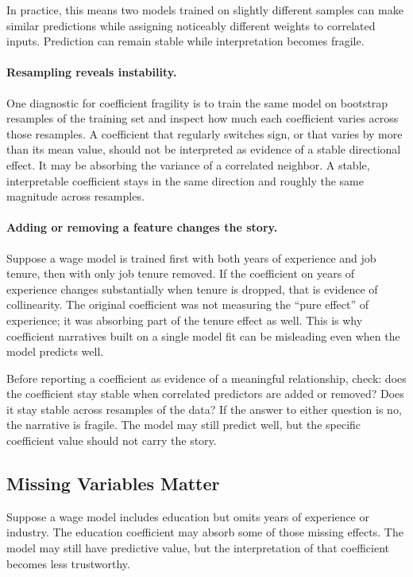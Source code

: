 In practice, this means two models trained on slightly different samples can make similar predictions while assigning noticeably different weights to correlated inputs. Prediction can remain stable while interpretation becomes fragile.

\paragraph{Resampling reveals instability.} One diagnostic for coefficient fragility is to train the same model on bootstrap resamples of the training set and inspect how much each coefficient varies across those resamples. A coefficient that regularly switches sign, or that varies by more than its mean value, should not be interpreted as evidence of a stable directional effect. It may be absorbing the variance of a correlated neighbor. A stable, interpretable coefficient stays in the same direction and roughly the same magnitude across resamples.

\paragraph{Adding or removing a feature changes the story.} Suppose a wage model is trained first with both years of experience and job tenure, then with only job tenure removed. If the coefficient on years of experience changes substantially when tenure is dropped, that is evidence of collinearity. The original coefficient was not measuring the ``pure effect'' of experience; it was absorbing part of the tenure effect as well. This is why coefficient narratives built on a single model fit can be misleading even when the model predicts well.

\begin{warningbox}
Before reporting a coefficient as evidence of a meaningful relationship, check: does the coefficient stay stable when correlated predictors are added or removed? Does it stay stable across resamples of the data? If the answer to either question is no, the narrative is fragile. The model may still predict well, but the specific coefficient value should not carry the story.
\end{warningbox}

\subsection{Missing Variables Matter}

Suppose a wage model includes education but omits years of experience or industry. The education coefficient may absorb some of those missing effects. The model may still have predictive value, but the interpretation of that coefficient becomes less trustworthy.

